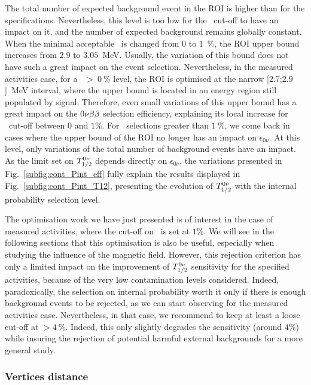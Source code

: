 The total number of expected background event in the ROI is higher than for the specifications.
Nevertheless, this level is too low for the \Pint\ cut-off to have an impact on it, and the number of expected background remains globally constant.
When the minimal acceptable \Pint\ is changed from $0$ to $1$~\%, the ROI upper bound increases from $2.9$ to $3.05$~MeV.
Usually, the variation of this bound does not have such a great impact on the event selection.
Nevertheless, in the measured activities case, for a \Pint~$>~0~\%$ level, the ROI is optimised at the narrow [$2.7$;$2.9$]~MeV interval, where the upper bound is located in an energy region still populated by signal.
Therefore, even small variations of this upper bound has a great impact on the $0\nu\beta\beta$ selection efficiency, explaining its local increase for \Pint\ cut-off between $0$ and $1$\%.
For \Pint\ selections greater than $1~\%$, we come back in cases where the upper bound of the ROI no longer has an impact on $\epsilon_{0\nu}$.
At this level, only variations of the total number of background events have an impact.
As the limit set on $T_{1/2}^{0\nu}$ depends directly on $\epsilon_{0\nu}$, the variations presented in Fig.~\ref{subfig:cont_Pint_eff} fully explain the results displayed in Fig.~\ref{subfig:cont_Pint_T12}, presenting the evolution of $T_{1/2}^{0\nu}$ with the internal probability selection level.

The optimisation work we have just presented is of interest in the case of measured activities, where the cut-off on \Pint\ is set at $1$\%.
We will see in the following sections that this optimisation is also be useful, especially when studying the influence of the magnetic field.
However, this rejection criterion has only a limited impact on the improvement of $T_{1/2}^{0\nu}$ sensitivity for the specified activities, because of the very low contamination levels considered.
Indeed, paradoxically, the selection on internal probability worth it only if there is enough background events to be rejected, as we can start observing for the measured activities case.
Nevertheless, in that case, we recommend to keep at least a loose cut-off at \Pint$>4~\%$.
Indeed, this only slightly degrades the sensitivity (around $4$\%) while insuring the rejection of potential harmful external backgrounds for a more general study.



\subsubsection{Vertices distance}


